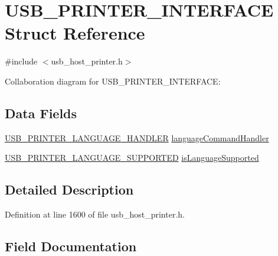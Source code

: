 \hypertarget{struct_u_s_b___p_r_i_n_t_e_r___i_n_t_e_r_f_a_c_e}{}\section{U\+S\+B\+\_\+\+P\+R\+I\+N\+T\+E\+R\+\_\+\+I\+N\+T\+E\+R\+F\+A\+C\+E Struct Reference}
\label{struct_u_s_b___p_r_i_n_t_e_r___i_n_t_e_r_f_a_c_e}


{\ttfamily \#include $<$usb\+\_\+host\+\_\+printer.\+h$>$}



Collaboration diagram for U\+S\+B\+\_\+\+P\+R\+I\+N\+T\+E\+R\+\_\+\+I\+N\+T\+E\+R\+F\+A\+C\+E\+:
\subsection*{Data Fields}
\begin{DoxyCompactItemize}
\item 
\hyperlink{usb__host__printer_8h_a386c8d36e894c3aaee8d1ec1802652d9}{U\+S\+B\+\_\+\+P\+R\+I\+N\+T\+E\+R\+\_\+\+L\+A\+N\+G\+U\+A\+G\+E\+\_\+\+H\+A\+N\+D\+L\+E\+R} \hyperlink{struct_u_s_b___p_r_i_n_t_e_r___i_n_t_e_r_f_a_c_e_a7095f4841419206d1173f4a7a054b65f}{language\+Command\+Handler}
\item 
\hyperlink{usb__host__printer_8h_ad717cd392ab7e52ccfe221f0e4f6a66f}{U\+S\+B\+\_\+\+P\+R\+I\+N\+T\+E\+R\+\_\+\+L\+A\+N\+G\+U\+A\+G\+E\+\_\+\+S\+U\+P\+P\+O\+R\+T\+E\+D} \hyperlink{struct_u_s_b___p_r_i_n_t_e_r___i_n_t_e_r_f_a_c_e_ad38e7848adc176375ef54731b46ea63b}{is\+Language\+Supported}
\end{DoxyCompactItemize}


\subsection{Detailed Description}


Definition at line 1600 of file usb\+\_\+host\+\_\+printer.\+h.



\subsection{Field Documentation}
\hypertarget{struct_u_s_b___p_r_i_n_t_e_r___i_n_t_e_r_f_a_c_e_ad38e7848adc176375ef54731b46ea63b}{}
